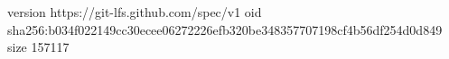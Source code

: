 version https://git-lfs.github.com/spec/v1
oid sha256:b034f022149cc30ecee06272226efb320be348357707198cf4b56df254d0d849
size 157117
